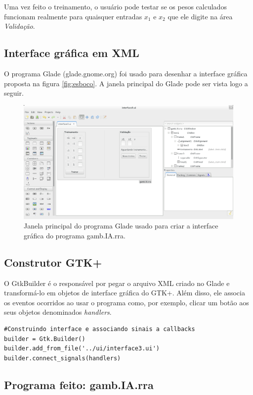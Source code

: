 \documentclass[11pt]{article}
\begin{document}
Uma vez feito o treinamento, o usuário pode testar se os pesos calculados funcionam realmente para quaisquer entradas $x_1$ e $x_2$ que ele digite na área \emph{Validação}.

\subsection{Interface gráfica em XML}

O programa Glade (glade.gnome.org) foi usado para desenhar a interface gráfica proposta na figura \ref{fig:esboco}. A janela principal do Glade pode ser vista logo a seguir.

\begin{figure}[h]
\centering
\includegraphics[scale=0.3]{figuras/glade}
\caption{Janela principal do programa Glade usado para criar a interface gráfica do programa gamb.IA.rra.}\label{fig:glade}
\end{figure}

\subsection{Construtor GTK+}

O GtkBuilder é o responsável por pegar o arquivo XML criado no Glade e transformá-lo em objetos de interface gráfica do GTK+. Além disso, ele associa os eventos ocorridos ao usar o programa como, por exemplo, clicar um botão aos seus objetos denominados \emph{handlers}.


\begin{lstlisting}[frame=single]
#Construindo interface e associando sinais a callbacks
builder = Gtk.Builder()
builder.add_from_file('../ui/interface3.ui')
builder.connect_signals(handlers)
\end{lstlisting}

\subsection{Programa feito: gamb.IA.rra}
\end{document}
